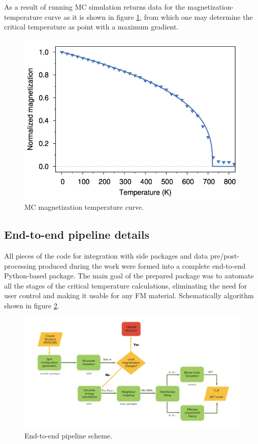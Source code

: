 As a result of running MC simulation returns data for the magnetization-temperature curve as it is shown in figure \ref{fig:mt_curve}, from which one may determine the critical temperature as point with a maximum gradient. 

\begin{figure}[H]
\centering
\captionsetup{justification=centering,margin=2cm}
\includegraphics[width=120mm]{fig/dft_fig/mt_curve.png}
\caption[MC magnetization temperature curve.]{MC magnetization temperature curve.}
\label{fig:mt_curve}
\end{figure}

\subsection{End-to-end pipeline details} 
All pieces of the code for integration with side packages and data pre/post-processing produced during the work were formed into a complete end-to-end Python-based package. The main goal of the prepared package was to automate all the stages of the critical temperature calculations, eliminating the need for user control and making it usable for any FM material.  Schematically algorithm shown in figure \ref{fig:End-to-end pipeline scheme}.

\begin{figure}[H]
\centering
\captionsetup{justification=centering,margin=2cm}
	\includegraphics[width=160mm]{fig/dft_fig/algo.png}
	\caption[End-to-end pipeline scheme.]{End-to-end pipeline scheme.}
\label{fig:End-to-end pipeline scheme}
\end{figure}


